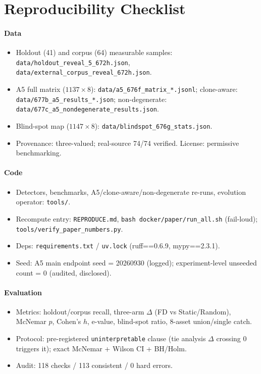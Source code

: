 
\section*{Reproducibility Checklist}

\paragraph{Data}
\begin{itemize}
  \item Holdout (41) and corpus (64) measurable samples: \texttt{data/holdout\_reveal\_5\_672h.json}, \texttt{data/external\_corpus\_reveal\_672h.json}.
  \item A5 full matrix ($1137\times8$): \texttt{data/a5\_676f\_matrix\_*.jsonl}; clone-aware: \texttt{data/677b\_a5\_results\_*.json}; non-degenerate: \texttt{data/677c\_a5\_nondegenerate\_results.json}.
  \item Blind-spot map ($1147\times8$): \texttt{data/blindspot\_676g\_stats.json}.
  \item Provenance: three-valued; real-source 74/74 verified. License: permissive benchmarking.
\end{itemize}

\paragraph{Code}
\begin{itemize}
  \item Detectors, benchmarks, A5/clone-aware/non-degenerate re-runs, evolution operator: \texttt{tools/}.
  \item Recompute entry: \texttt{REPRODUCE.md}, \texttt{bash docker/paper/run\_all.sh} (fail-loud); \texttt{tools/verify\_paper\_numbers.py}.
  \item Deps: \texttt{requirements.txt} / \texttt{uv.lock} (ruff==0.6.9, mypy==2.3.1).
  \item Seed: A5 main endpoint seed = 20260930 (logged); experiment-level unseeded count = 0 (audited, disclosed).
\end{itemize}

\paragraph{Evaluation}
\begin{itemize}
  \item Metrics: holdout/corpus recall, three-arm $\Delta$ (FD vs Static/Random), McNemar $p$, Cohen's $h$, e-value, blind-spot ratio, 8-asset union/single catch.
  \item Protocol: pre-registered \texttt{uninterpretable} clause (tie analysis $\Delta$ crossing 0 triggers it); exact McNemar + Wilson CI + BH/Holm.
  \item Audit: 118 checks / 113 consistent / 0 hard errors.
\end{itemize}

